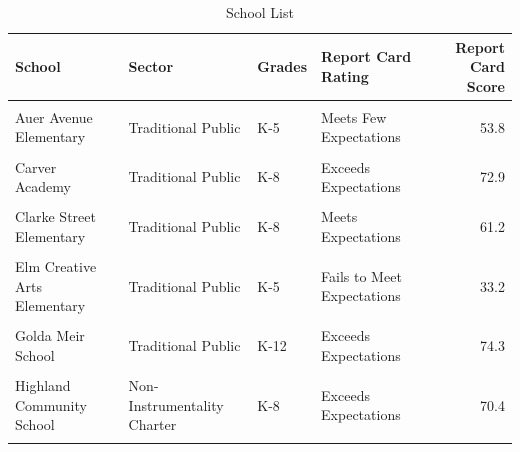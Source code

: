 \documentclass[
]{article}
\begin{document}
\begin{longtable}[t]{>{\raggedright\arraybackslash}p{10em}ll>{\raggedright\arraybackslash}p{10em}r}
\caption{\label{tab:unnamed-chunk-3}School List}\\
\toprule
School & Sector & Grades & Report Card Rating & Report Card Score\\
\midrule
\cellcolor{gray!6}{Alliance School of Milwaukee} & \cellcolor{gray!6}{Instrumentality Charter} & \cellcolor{gray!6}{9-12} & \cellcolor{gray!6}{Alternate Rating - Needs Improvement} & \cellcolor{gray!6}{NA}\\
Auer Avenue Elementary & Traditional Public & K-5 & Meets Few Expectations & 53.8\\
\cellcolor{gray!6}{Brown Street Academy} & \cellcolor{gray!6}{Traditional Public} & \cellcolor{gray!6}{K-5} & \cellcolor{gray!6}{Meets Few Expectations} & \cellcolor{gray!6}{55.7}\\
Carver Academy & Traditional Public & K-8 & Exceeds Expectations & 72.9\\
\cellcolor{gray!6}{Clara Mohammed School} & \cellcolor{gray!6}{Private} & \cellcolor{gray!6}{K-12} & \cellcolor{gray!6}{NR-DATA} & \cellcolor{gray!6}{NA}\\
\addlinespace
Clarke Street Elementary & Traditional Public & K-8 & Meets Expectations & 61.2\\
\cellcolor{gray!6}{Cross Trainers Academy} & \cellcolor{gray!6}{Private} & \cellcolor{gray!6}{K-12} & \cellcolor{gray!6}{Meets Expectations} & \cellcolor{gray!6}{69.2}\\
Elm Creative Arts Elementary & Traditional Public & K-5 & Fails to Meet Expectations & 33.2\\
\cellcolor{gray!6}{Franklin Elementary} & \cellcolor{gray!6}{Traditional Public} & \cellcolor{gray!6}{K-8} & \cellcolor{gray!6}{Meets Expectations} & \cellcolor{gray!6}{62.7}\\
Golda Meir School & Traditional Public & K-12 & Exceeds Expectations & 74.3\\
\addlinespace
\cellcolor{gray!6}{Grant Gordon Learning Center} & \cellcolor{gray!6}{Traditional Public} & \cellcolor{gray!6}{K-5} & \cellcolor{gray!6}{NA} & \cellcolor{gray!6}{NA}\\
Highland Community School & Non-Instrumentality Charter & K-8 & Exceeds Expectations & 70.4\\
\cellcolor{gray!6}{Holmes Elementary} & \cellcolor{gray!6}{Traditional Public} & \cellcolor{gray!6}{K-8} & \cellcolor{gray!6}{Meets Expectations} & \cellcolor{gray!6}{60.7}\\

\end{longtable}
\end{document}
